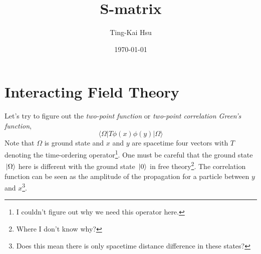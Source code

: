 \documentclass[12pt]{article}
\title{S-matrix}
\author{Ting-Kai Hsu}
\date{\today}
\numberwithin{equation}{section}
\begin{document}
\maketitle
\tableofcontents
\section{Interacting Field Theory}
Let's try to figure out the \textit{two-point function} or \textit{two-point correlation Green's function},
\begin{equation}
    \langle\Omega|T\phi(x)\phi(y)|\Omega\rangle
\end{equation}
Note that $\Omega$ is ground state and $x$ and $y$ are spacetime four vectors with $T$ denoting the time-ordering operator\footnote{I couldn't figure out why we need this operator here.}.
One must be careful that the ground state $\ket*{\Omega}$ here is different with the ground state $\ket*{0}$ in free theory\footnote{Where I don't know why?}.
The correlation function can be seen as the amplitude of the propagation for a particle between $y$ and $x$\footnote{Does this mean there is only spacetime distance difference in these states?}.
\end{document}
